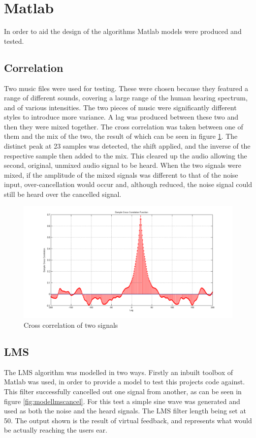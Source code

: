 \section{Matlab}
In order to aid the design of the algorithms Matlab models were produced and
tested.

\subsection{Correlation}

Two music files were used for testing.
These were chosen because they featured a range of different sounds, covering a large range of the human hearing spectrum, and of various intensities.
The two pieces of music were significantly different styles to introduce more variance.
A lag was produced between these two and then they were mixed together.
The cross correlation was taken between one of them and the mix of the two, the result of which can be seen in figure \ref{fig:modelcrosscorr}.
The distinct peak at 23 samples was detected, the shift applied, and the inverse of the respective sample then added to the mix.
This cleared up the audio allowing the second, original, unmixed audio signal to be heard.
When the two signals were mixed, if the amplitude of the mixed signals was different to that of the noise input, over-cancellation would occur and, although reduced, the noise signal could still be heard over the cancelled signal.

\begin{figure}[H]
	\centering
	\includegraphics[width=\textwidth]{./img/crosscorr.png}
	\caption{Cross correlation of two signals}
	\label{fig:modelcrosscorr}
\end{figure}

\subsection{LMS}
The LMS algorithm was modelled in two ways.
Firstly an inbuilt toolbox of Matlab was used, in order to provide a model to test this projects code against.
This filter successfully cancelled out one signal from another, as can be seen in figure \ref{fig:modellmscancel}.
For this test a simple sine wave was generated and used as both the noise and the heard signals.
The LMS filter length being set at 50.
The output shown is the result of virtual feedback, and represents what would be actually reaching the users ear.

